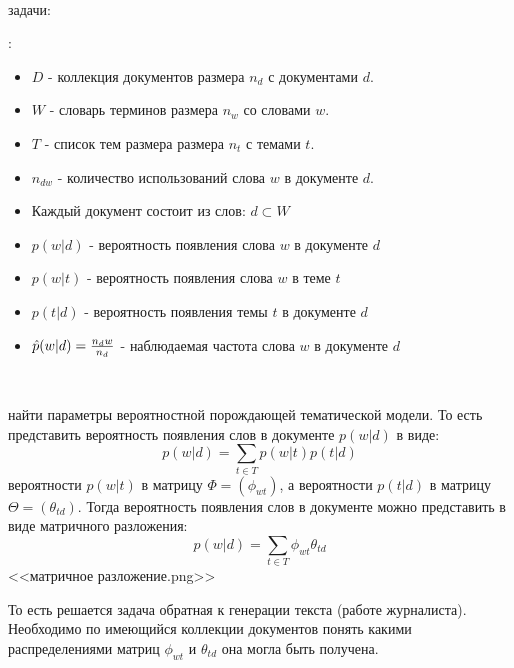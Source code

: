 ~\

 задачи:

:

\begin{itemize}
    \item $D$ - коллекция документов размера $n_d$ с документами $d$.
    \item $W$ - словарь терминов размера $n_w$ со словами $w$.
    \item $T$ - список тем размера размера $n_t$ с темами $t$.
    \item $n_{dw}$ - количество использований слова $w$ в документе $d$.
    \item Каждый документ состоит из слов: $d \subset W$
    \item $p(w|d)$ - вероятность появления слова $w$ в документе $d$
    \item $p(w|t)$ - вероятность появления слова $w$ в теме $t$
    \item $p(t|d)$ - вероятность появления темы $t$ в документе $d$
    \item $\hat{p}(w|d) = {{n_dw}\over{n_d}}$ - наблюдаемая частота слова $w$ в документе $d$
\end{itemize}

~\

 найти параметры вероятностной порождающей тематической модели. То есть представить вероятность появления слов в документе $p(w|d)$ в виде:
$$
p(w|d) = \sum_{t \in T}{ p(w|t) p(t|d) }
$$
 вероятности $p(w|t)$ в матрицу $\Phi=(\phi_{wt})$, а вероятности $p(t|d)$ в матрицу $\Theta=(\theta_{td})$. Тогда вероятность появления слов в документе можно представить в виде матричного разложения:
$$
p(w|d) = \sum_{t \in T}{ \phi_{wt} \theta_{td} }
$$
<<матричное разложение.png>>

То есть решается задача обратная к генерации текста (работе журналиста). Необходимо по имеющийся коллекции документов понять какими распределениями матриц $\phi_{wt}$ и $\theta_{td}$ она могла быть получена.

%
